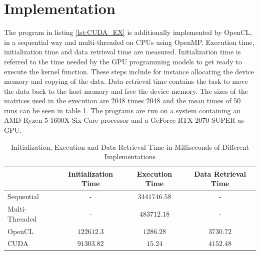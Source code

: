 \section{Implementation}
The program in listing \ref{lst:CUDA_EX} is additionally implemented by OpenCL, in a sequential way and multi-threaded on CPUs using OpenMP.
Execution time, initialization time and data retrieval time are measured.
Initialization time is referred to the time needed by the GPU programming models to get ready to execute the kernel function.
These steps include for instance allocating the device memory and copying of the data.
Data retrieval time contains the task to move the data back to the host memory and free the device memory.
The sizes of the matrices used in the execution are 2048 times 2048 and the mean times of 50 runs can be seen in table \ref{tab:time}.
The programs are run on a system containing an AMD Ryzen 5 1600X Six-Core processor and a GeForce RTX 2070 SUPER as GPU.
\begin{table}[htbp]
  \centering
  \caption{Initialization, Execution and Data Retrieval Time in Milliseconds of Different Implementations}
  \label{tab:time}
  \begin{tabular}{|l|c|c|c|}
	\hline
	& Initialization Time & Execution Time & Data Retrieval Time \\\hline
	Sequential & \texttt{-} & \(3441746.58\) & \texttt{-} \\\hline
	Multi-Threaded & \texttt{-} & \(483712.18\) & \texttt{-} \\\hline
	OpenCL & \(122612.3\) & \(1286.28\) & \(3730.72\) \\\hline
	CUDA & \(91303.82\) & \(15.24\) & \(4152.48\) \\\hline
  \end{tabular}
\end{table}


